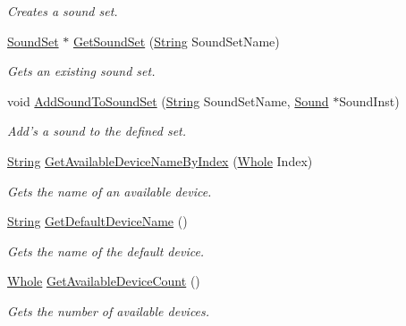 \begin{DoxyCompactItemize}
\begin{DoxyCompactList}\small\item\em Creates a sound set. \item\end{DoxyCompactList}\item 
\hyperlink{namespacephys_ab780c3162da5699fe421f3739ba03fc4}{SoundSet} $\ast$ \hyperlink{classphys_1_1SoundManager_a419edd2aed481ed7eff4beb11c9a6cf2}{GetSoundSet} (\hyperlink{namespacephys_aa03900411993de7fbfec4789bc1d392e}{String} SoundSetName)
\begin{DoxyCompactList}\small\item\em Gets an existing sound set. \item\end{DoxyCompactList}\item 
void \hyperlink{classphys_1_1SoundManager_a89c05a5628e187939ea30b0e4b149931}{AddSoundToSoundSet} (\hyperlink{namespacephys_aa03900411993de7fbfec4789bc1d392e}{String} SoundSetName, \hyperlink{classphys_1_1Sound}{Sound} $\ast$SoundInst)
\begin{DoxyCompactList}\small\item\em Add's a sound to the defined set. \item\end{DoxyCompactList}\item 
\hyperlink{namespacephys_aa03900411993de7fbfec4789bc1d392e}{String} \hyperlink{classphys_1_1SoundManager_a842f7cba6b12585bca77f642ecb8be79}{GetAvailableDeviceNameByIndex} (\hyperlink{namespacephys_a460f6bc24c8dd347b05e0366ae34f34a}{Whole} Index)
\begin{DoxyCompactList}\small\item\em Gets the name of an available device. \item\end{DoxyCompactList}\item 
\hyperlink{namespacephys_aa03900411993de7fbfec4789bc1d392e}{String} \hyperlink{classphys_1_1SoundManager_ac4814331683597034b26fac5c1c69bfa}{GetDefaultDeviceName} ()
\begin{DoxyCompactList}\small\item\em Gets the name of the default device. \item\end{DoxyCompactList}\item 
\hyperlink{namespacephys_a460f6bc24c8dd347b05e0366ae34f34a}{Whole} \hyperlink{classphys_1_1SoundManager_adb5717af71da8829600fd613a2ce615b}{GetAvailableDeviceCount} ()
\begin{DoxyCompactList}\small\item\em Gets the number of available devices. \item\end{DoxyCompactList}\item 

\end{DoxyCompactItemize}

